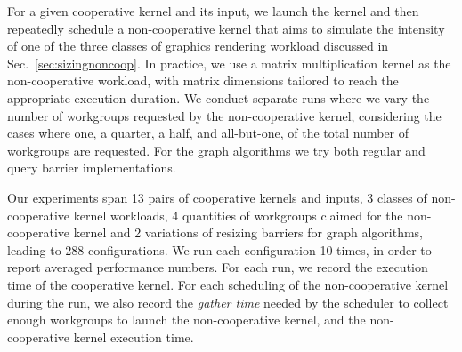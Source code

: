 \documentclass[parskip=half,sigconf,review, anonymous=true, acmcopyrightmode=none]{acmart}
\newcommand{\mysec}{Sec.~}
\begin{document}
 For a given cooperative kernel and
its input, we launch the kernel and then repeatedly schedule a
non-cooperative kernel that aims to simulate the intensity of one of
the three classes of graphics rendering workload discussed in
\mysec\ref{sec:sizingnoncoop}. In practice, we use a matrix
multiplication kernel as the non-cooperative workload, with matrix
dimensions tailored to reach the appropriate execution duration.  We
conduct separate runs where we vary the number of workgroups requested
by the non-cooperative kernel, considering the cases where one, a
quarter, a half, and all-but-one, of the total number of workgroups
are requested. For the graph algorithms we try both
regular and query barrier implementations.

Our experiments span 13 pairs of cooperative kernels and inputs, 3
classes of non-cooperative kernel workloads, 4 quantities of
workgroups claimed for the non-cooperative kernel and 2 variations of
resizing barriers for graph algorithms, leading to 288 configurations.
We run each configuration 10 times, in order to report averaged
performance numbers. For each run, we record the execution time of the
cooperative kernel. For each scheduling of the non-cooperative kernel
during the run, we also record the \emph{gather time} needed by the
scheduler to collect enough workgroups to launch the non-cooperative
kernel, and the non-cooperative kernel execution time. 
%


\end{document}

